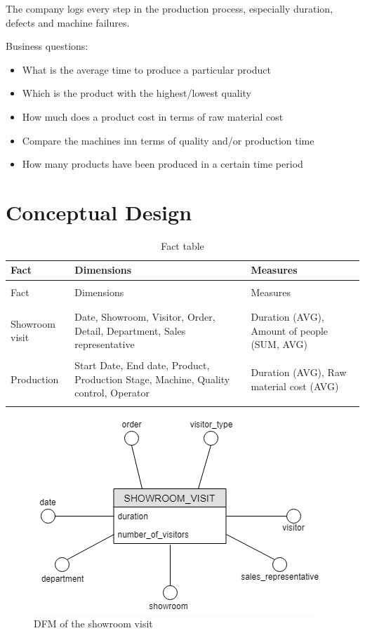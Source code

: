 \documentclass[letterpaper,12pt]{article}
\begin{document}
The company logs every step in the production process, especially duration, defects and machine failures.

Business questions:
\begin{itemize}
        \item What is the average time to produce a particular product
        \item Which is the product with the highest/lowest quality
        \item How much does a product cost in terms of raw material cost
				\item Compare the machines inn terms of quality and/or production time
				\item How many products have been produced in a certain time period
\end{itemize}

\section{Conceptual Design}

\begingroup
\renewcommand\arraystretch{0.5}
\begin{longtable}{p{3cm}p{6cm}p{4cm}}
        \caption{Fact table} \\
        Fact & Dimensions & Measures \\
        \endfirsthead \\
        Fact & Dimensions & Measures \\
        \endhead \\
        \hline \\
        Showroom visit & Date, Showroom, Visitor, Order, Detail, Department, Sales representative & Duration (AVG), Amount of people (SUM, AVG) \\
        \hline \\
        Production & Start Date, End date, Product, Production Stage, Machine, Quality control, Operator & Duration (AVG), Raw material cost (AVG) \\
        \hline \\
\end{longtable}
\endgroup

\begin{figure}[H] 
        \centering
        \includegraphics[scale=0.65]{../images/DFM_Showroom_Simple.png}
        \caption{
                \label{fig:showroom}  
                DFM of the showroom visit
        }
\end{figure}
\end{document}

